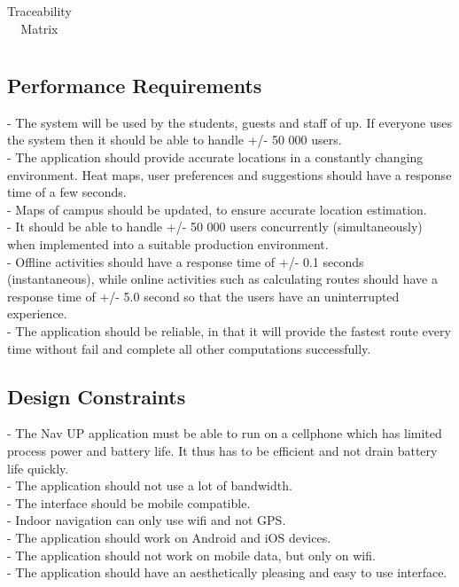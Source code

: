 \documentclass[12pt]{article}
\begin{document}
\begin{table}
\begin{tabular}{|lc|c|c|c|c|c|c|}
		\hline
	\end{tabular}
	\caption{Traceability Matrix} 
	\label{table:nonlin}
	\end{table}
		
	\subsection{Performance Requirements}
	- The system will be used by the students, guests and staff of up. If everyone uses the system then it should be able to handle +/- 50 000 users. \\
	- The application should provide accurate locations in a constantly changing environment. Heat maps, user preferences and suggestions should have a response time of a few seconds.\\
	- Maps of campus should be updated, to ensure accurate location estimation. \\
	- It should be able to handle +/- 50 000 users concurrently (simultaneously) when implemented into a suitable production environment. \\
	- Offline activities should have a response time of +/- 0.1 seconds (instantaneous), while online activities such as calculating routes should have a response time of +/- 5.0 second so that the users have an uninterrupted experience. \\
	- The application should be reliable, in that it will provide the fastest route every time without fail and complete all other computations successfully. 
	\subsection{Design Constraints}
	- The Nav UP application must be able to run on a cellphone which has limited process power and battery life. It thus has to be efficient and not drain battery life quickly. \\
	- The application should not use a lot of bandwidth.\\
	- The interface should be mobile compatible.\\
	- Indoor navigation can only use wifi and not GPS. \\
	- The application should work on Android and iOS devices. \\
	- The application should not work on mobile data, but only on wifi. \\
	- The application should have an aesthetically pleasing and easy to use interface. 
\end{document}
